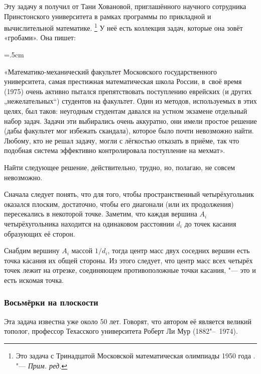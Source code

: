 \documentclass[twoside]{book}
\begin{document}
Эту задачу я получил от Тани Ховановой, приглашённого научного сотрудника Принстонского университета в рамках программы по прикладной и вычислительной математике.%
\footnote{Это задача с Тринадцатой Московской математическая олимпиады 1950 года
\cite[13.17]{МосковскиеМО}. "--- \emph{Прим. ред.}}
У неё есть коллекция задач, которые она зовёт «гробами».
Она пишет:

\medskip

\begin{trivlist}\leftskip=5mm\rightskip=.5cm
  \small
\item\relax«Математико-механический факультет Московского государственного университета, самая престижная математическая школа России, в~своё время (1975) очень активно пытался препятствовать поступлению еврейских (и других „нежелательных“) студентов на факультет.
Один из методов, используемых в этих целях, был таков: неугодным студентам давался на устном экзамене отдельный набор задач.
Задачи эти выбирались очень аккуратно, они имели простое решение (дабы факультет мог избежать скандала), которое было почти невозможно найти.
Любому, кто не решал задачу, могли с лёгкостью отказать в приёме, так что подобная система эффективно контролировала поступление на мехмат». 
\end{trivlist}

\medskip

Найти следующее решение, действительно, трудно, но, полагаю, не совсем невозможно.

\medskip

Сначала следует понять, что для того, чтобы пространственный четырёхугольник оказался плоским, достаточно, чтобы его диагонали (или их продолжения) пересекались в некоторой точке.
Заметим, что каждая вершина $A_i$ четырёхугольника находится на одинаковом расстоянии $d_i$ до точек касания образующих её сторон.

Снабдим вершину $A_i$ массой $1/d_i$, тогда центр масс двух соседних вершин есть точка касания их общей стороны.
Из этого следует, что центр масс всех четырёх точек лежит на отрезке, соединяющем противоположные точки касания, "--- это и есть искомая точка.
\heart

\subsubsection*{Восьмёрки на плоскости}%

Эта задача известна уже около 50 лет.
Говорят, что автором её является великий тополог, профессор Техасского университета Роберт Ли Мур (1882"--~1974). %
\end{document}
